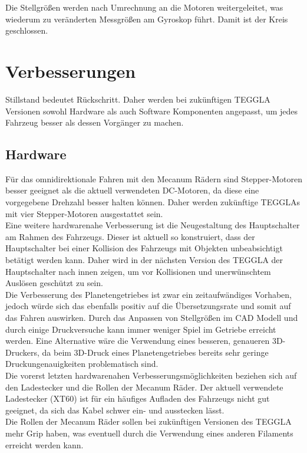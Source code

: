 Die Stellgrößen werden nach Umrechnung an die Motoren weitergeleitet, was wiederum zu veränderten Messgrößen am Gyroskop führt. 
Damit ist der Kreis geschlossen. 


\section{Verbesserungen}
Stillstand bedeutet Rückschritt. Daher werden bei zukünftigen TEGGLA Versionen sowohl Hardware als auch Software Komponenten angepasst, um jedes Fahrzeug besser als dessen Vorgänger zu machen.

\subsection{Hardware}
Für das omnidirektionale Fahren mit den Mecanum Rädern sind Stepper-Motoren besser geeignet als die aktuell verwendeten DC-Motoren, da diese eine vorgegebene Drehzahl besser halten können. Daher werden zukünftige TEGGLAs mit vier Stepper-Motoren ausgestattet sein.\\

Eine weitere hardwarenahe Verbesserung ist die Neugestaltung des Hauptschalter am Rahmen des Fahrzeugs. Dieser ist aktuell so konstruiert, dass der Hauptschalter bei einer Kollision des Fahrzeugs mit Objekten unbeabsichtigt betätigt werden kann. Daher wird in der nächsten Version des TEGGLA der Hauptschalter nach innen zeigen, um vor Kollisionen und unerwünschtem Auslösen geschützt zu sein.\\

Die Verbesserung des Planetengetriebes ist zwar ein zeitaufwändiges Vorhaben, jedoch würde sich das ebenfalls positiv auf die Übersetzungsrate und somit auf das Fahren auswirken. Durch das Anpassen von Stellgrößen im CAD Modell und durch einige Druckversuche kann immer weniger Spiel im Getriebe erreicht werden. Eine Alternative wäre die Verwendung eines besseren, genaueren 3D-Druckers, da beim 3D-Druck eines Planetengetriebes bereits sehr geringe Druckungenauigkeiten problematisch sind.\\

Die vorerst letzten hardwarenahen Verbesserungsmöglichkeiten beziehen sich auf den Ladestecker und die Rollen der Mecanum Räder. Der aktuell verwendete Ladestecker (XT60) ist für ein häufiges Aufladen des Fahrzeugs nicht gut geeignet, da sich das Kabel schwer ein- und ausstecken lässt.\\

Die Rollen der Mecanum Räder sollen bei zukünftigen Versionen des TEGGLA mehr Grip haben, was eventuell durch die Verwendung eines anderen Filaments erreicht werden kann.\\


